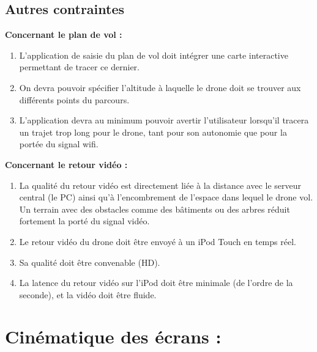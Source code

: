 \documentclass{article}
\begin{document}
	\subsection{Autres contraintes}
	    \begin{flushleft}
	        \textbf{Concernant le plan de vol :} 
	    \end{flushleft}
	    \begin{enumerate}
            \item  L'application de saisie du plan de vol doit intégrer une carte interactive permettant de tracer ce dernier.
    		 \item On devra pouvoir spécifier l'altitude à laquelle le drone doit se trouver aux différents points du parcours.
    		 \item L'application devra au minimum pouvoir avertir l'utilisateur lorsqu'il tracera un trajet trop long pour le drone, tant pour son autonomie que pour la portée du signal wifi.
		 \end{enumerate}
		
	    \begin{flushleft}
	        \textbf{Concernant le retour vidéo :}
	    \end{flushleft}
	     \begin{enumerate}
	     \item La qualité du retour vidéo est directement liée à la distance avec le serveur central (le PC) ainsi qu'à l'encombrement de l'espace dans lequel le drone vol. Un terrain avec des obstacles comme des bâtiments ou des arbres réduit fortement la porté du signal vidéo.
	     \item Le retour vidéo du drone doit être envoyé à un iPod Touch en temps réel.
	     \item Sa qualité doit être convenable (HD).
		 \item La latence du retour vidéo sur l'iPod doit être minimale (de l'ordre de la seconde), et la vidéo doit être fluide.
		 \end{enumerate}
		 
\section{Cinématique des écrans :}
\end{document}
